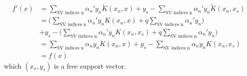 \documentclass[12pt]{article}
\begin{document}
\begin{equation*}
    \begin{split}
        f'(x) &= \sum_{\text{SV indices n}} \alpha_n' y_n \tilde{K}(x_n, x) + y_s - \sum_{\text{SV indices n}} \alpha_n' y_n \tilde{K}(x_n, x_s) \\
        &= \bigg( \sum_{\text{SV indices n}} \alpha_n' y_n K(x_n, x) + q\sum_{\text{SV indices n}} \alpha_n'y_n \bigg) \\ 
        &+ y_s - \bigg( \sum_{\text{SV indices n}} \alpha_n' y_n K(x_n, x_s) + q\sum_{\text{SV indices n}} \alpha_n'y_n \bigg) \\
        &= \sum_{\text{SV indices n}} \alpha_n y_n K(x_n, x) + y_s - \sum_{\text{SV indices n}} \alpha_n y_n K(x_n, x_s) \\
        &= f(x)
    \end{split}
\end{equation*}
which $(x_s, y_s)$ is a free support vector.
\end{document}
